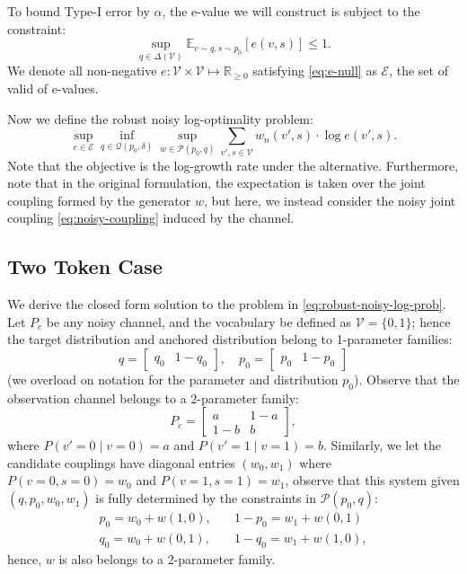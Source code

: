 \documentclass[12pt]{article}
\theoremstyle{plain}
\theoremstyle{definition}
\begin{document}
To bound Type-I error by $\alpha$, the e-value we will construct is subject to the constraint:
\begin{equation}\label{eq:e-null}
    \sup_{q \in \Delta(\mathcal{V})}\mathbb{E}_{v \sim q, s \sim p_0}[e(v,s)] \le 1.
\end{equation}
We denote all non-negative $e: \mathcal{V} \times \mathcal{V} \mapsto \mathbb{R}_{\ge 0}$ satisfying \eqref{eq:e-null} as $\mathcal{E}$, the set of valid of e-values. 

Now we define the robust noisy log-optimality problem:
\begin{equation}\label{eq:robust-noisy-log-prob}
    \sup_{e \in \mathcal{E}}\inf_{q \in \mathcal{Q}(p_0,\delta)}\sup_{w \in \mathcal{P}(p_0,q)}\sum_{v',s \in \mathcal{V}}w_n(v',s) \cdot \log e(v',s).
\end{equation}
Note that the objective is the log-growth rate under the alternative. Furthermore, note that in the original formulation, the expectation is taken over the joint coupling formed by the generator $w$, but here, we instead consider the noisy joint coupling \eqref{eq:noisy-coupling} induced by the channel. 

\subsection{Two Token Case}
We derive the closed form solution to the problem in \eqref{eq:robust-noisy-log-prob}. Let $P_c$ be any noisy channel, and the vocabulary be defined as $\mathcal{V} = \{0,1\}$; hence the target distribution and anchored distribution belong to 1-parameter families:
\[q = \begin{bmatrix}
    q_0 & 1-q_0
\end{bmatrix}, \quad p_0 = \begin{bmatrix}
    p_0 & 1-p_0
\end{bmatrix} \]
(we overload on notation for the parameter and distribution $p_0$). Observe that the observation channel belongs to a 2-parameter family:
\[P_c = \begin{bmatrix}
    a & 1-a \\
    1-b & b
\end{bmatrix},\]
where $P(v' = 0 \mid v = 0) = a$ and $P(v' = 1 \mid v =1) = b$.
Similarly, we let the candidate couplings have diagonal entries $(w_0, w_1)$ where $P(v = 0, s = 0) = w_0$ and $P(v=1, s= 1) = w_1$, observe that this system given $(q,p_0, w_0, w_1)$ is fully determined by the constraints in $\mathcal{P}(p_0,q)$: 
\begin{align*}p_0 = w_0 + w(1, 0), \quad &1-p_0 = w_1 + w(0,1) \\
q_0 = w_0 + w(0,1), \quad & 1-q_0 = w_1 + w(1,0),
\end{align*}
hence, $w$ is also belongs to a 2-parameter family.
\end{document}
